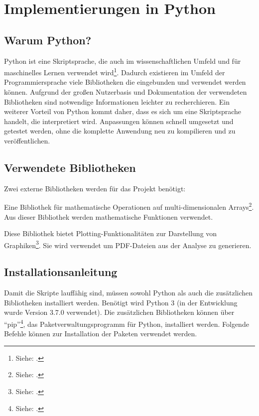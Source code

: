 \chapter{Implementierungen in Python}
\label{chp:python:implementation}

\section{Warum Python?}
Python ist eine Skriptsprache, die auch im wissenschaftlichen Umfeld und für maschinelles Lernen verwendet wird\footnote{Siehe: \cite{Fuxjaeger2017}.}.
Dadurch existieren im Umfeld der Programmiersprache viele Bibliotheken die eingebunden und verwendet werden können.
Aufgrund der großen Nutzerbasis und Dokumentation der verwendeten Bibliotheken sind notwendige Informationen leichter zu recherchieren.
Ein weiterer Vorteil von Python kommt daher, dass es sich um eine Skriptsprache handelt, die interpretiert wird.
Anpassungen können schnell umgesetzt und getestet werden, ohne die komplette Anwendung neu zu kompilieren und zu veröffentlichen.

\section{Verwendete Bibliotheken}
Zwei externe Bibliotheken werden für das Projekt benötigt:
\begin{description}[style=nextline]
	\item[NumPy] Eine Bibliothek für mathematische Operationen auf multi-dimensionalen Arrays\footnote{Siehe: \cite{Athanasias2014}.}. Aus dieser Bibliothek werden mathematische Funktionen verwendet.
	\item[Matplotlib] Diese Bibliothek bietet Plotting-Funktionalitäten zur Darstellung von Graphiken\footnote{Siehe: \cite{Matplotlib2019}.}. Sie wird verwendet um PDF-Dateien aus der Analyse zu generieren.
\end{description}
\section{Installationsanleitung}
Damit die Skripte lauffähig sind, müssen sowohl Python als auch die zusätzlichen Bibliotheken installiert werden.
Benötigt wird Python 3 (in der Entwicklung wurde Version 3.7.0 verwendet).
Die zusätzlichen Bibliotheken können über \enquote{pip}\footnote{Siehe: \cite{Foundation2019}.}, das Paketverwaltungsprogramm für Python, installiert werden. 
Folgende Befehle können zur Installation der Paketen verwendet werden.

